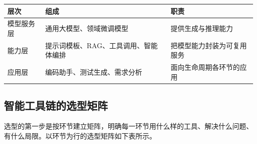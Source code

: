 \documentclass[
]{ctexbook}
\newcounter{none}
\begin{document}
{\def\LTcaptype{none} %
\begin{longtable}[]{@{}
  >{\raggedright\arraybackslash}p{}
  >{\raggedright\arraybackslash}p{}
  >{\raggedright\arraybackslash}p{}@{}}
\toprule\noalign{}
\begin{minipage}[b]{\linewidth}\raggedright
层次
\end{minipage} & \begin{minipage}[b]{\linewidth}\raggedright
组成
\end{minipage} & \begin{minipage}[b]{\linewidth}\raggedright
职责
\end{minipage} \\
\midrule\noalign{}
\endhead
\bottomrule\noalign{}
\endlastfoot
模型服务层 & 通用大模型、领域微调模型 & 提供生成与推理能力 \\
能力层 & 提示词模板、RAG、工具调用、智能体编排 &
把模型能力封装为可复用服务 \\
应用层 & 编码助手、测试生成、需求分析 & 面向生命周期各环节的应用 \\
\end{longtable}
}

\subsection{智能工具链的选型矩阵}\label{ux667aux80fdux5de5ux5177ux94feux7684ux9009ux578bux77e9ux9635}

选型的第一步是按环节建立矩阵，明确每一环节用什么样的工具、解决什么问题、有什么局限。以环节为行的选型矩阵如下表所示。
\end{document}
